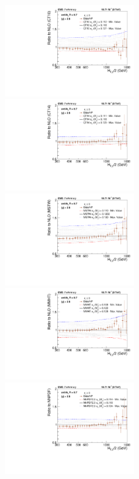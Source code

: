\begin{figure}[!htbp]
  \begin{center}
    \includegraphics[width=0.5\textwidth]{Plots_HT_2_150/Sensitivity_Pdfs/Sensitivity_3_ratio_NLO_CT10.pdf}%
    \includegraphics[width=0.5\textwidth]{Plots_HT_2_150/Sensitivity_Pdfs/Sensitivity_3_ratio_NLO_CT14.pdf}\\
    \includegraphics[width=0.5\textwidth]{Plots_HT_2_150/Sensitivity_Pdfs/Sensitivity_3_ratio_NLO_MSTW2008.pdf}%
    \includegraphics[width=0.5\textwidth]{Plots_HT_2_150/Sensitivity_Pdfs/Sensitivity_3_ratio_NLO_MMHT2014.pdf}\\
    \includegraphics[width=0.5\textwidth]{Plots_HT_2_150/Sensitivity_Pdfs/Sensitivity_3_ratio_NLO_NNPDF23.pdf}

\end{center}
\end{figure}

